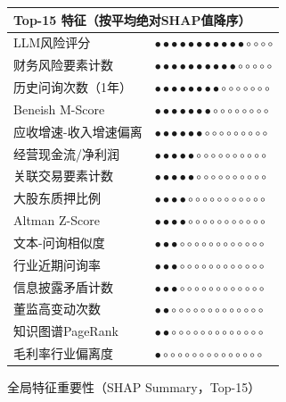 \begin{figure}[H]
\centering
\small
\begin{tabular}{ll}
\multicolumn{2}{l}{\textbf{Top-15 特征（按平均绝对SHAP值降序）}} \\
\midrule
LLM风险评分 & $\bullet\bullet\bullet\bullet\bullet\bullet\bullet\bullet\bullet\bullet\bullet\circ\circ\circ\circ$ \\
财务风险要素计数 & $\bullet\bullet\bullet\bullet\bullet\bullet\bullet\bullet\bullet\bullet\circ\circ\circ\circ\circ$ \\
历史问询次数（1年） & $\bullet\bullet\bullet\bullet\bullet\bullet\bullet\bullet\circ\circ\circ\circ\circ\circ\circ$ \\
Beneish M-Score & $\bullet\bullet\bullet\bullet\bullet\bullet\bullet\circ\circ\circ\circ\circ\circ\circ\circ$ \\
应收增速-收入增速偏离 & $\bullet\bullet\bullet\bullet\bullet\bullet\circ\circ\circ\circ\circ\circ\circ\circ\circ$ \\
经营现金流/净利润 & $\bullet\bullet\bullet\bullet\bullet\circ\circ\circ\circ\circ\circ\circ\circ\circ\circ$ \\
关联交易要素计数 & $\bullet\bullet\bullet\bullet\bullet\circ\circ\circ\circ\circ\circ\circ\circ\circ\circ$ \\
大股东质押比例 & $\bullet\bullet\bullet\bullet\circ\circ\circ\circ\circ\circ\circ\circ\circ\circ\circ$ \\
Altman Z-Score & $\bullet\bullet\bullet\bullet\circ\circ\circ\circ\circ\circ\circ\circ\circ\circ\circ$ \\
文本-问询相似度 & $\bullet\bullet\bullet\circ\circ\circ\circ\circ\circ\circ\circ\circ\circ\circ\circ$ \\
行业近期问询率 & $\bullet\bullet\bullet\circ\circ\circ\circ\circ\circ\circ\circ\circ\circ\circ\circ$ \\
信息披露矛盾计数 & $\bullet\bullet\bullet\circ\circ\circ\circ\circ\circ\circ\circ\circ\circ\circ\circ$ \\
董监高变动次数 & $\bullet\bullet\circ\circ\circ\circ\circ\circ\circ\circ\circ\circ\circ\circ\circ$ \\
知识图谱PageRank & $\bullet\bullet\circ\circ\circ\circ\circ\circ\circ\circ\circ\circ\circ\circ\circ$ \\
毛利率行业偏离度 & $\bullet\circ\circ\circ\circ\circ\circ\circ\circ\circ\circ\circ\circ\circ\circ$ \\
\end{tabular}
\caption{全局特征重要性（SHAP Summary，Top-15）}
\label{fig:shap_summary}
\end{figure}

